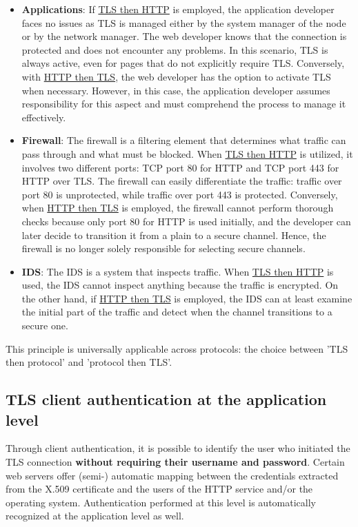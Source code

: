 \begin{itemize}
    \item \textbf{Applications}: If \underline{TLS then HTTP} is employed, the application developer faces no issues as TLS is managed either by the system manager of the node or by the network manager. The web developer knows that the connection is protected and does not encounter any problems. In this scenario, TLS is always active, even for pages that do not explicitly require TLS. Conversely, with \underline{HTTP then TLS}, the web developer has the option to activate TLS when necessary. However, in this case, the application developer assumes responsibility for this aspect and must comprehend the process to manage it effectively.
    
    \item \textbf{Firewall}: The firewall is a filtering element that determines what traffic can pass through and what must be blocked. When \underline{TLS then HTTP} is utilized, it involves two different ports: TCP port 80 for HTTP and TCP port 443 for HTTP over TLS. The firewall can easily differentiate the traffic: traffic over port 80 is unprotected, while traffic over port 443 is protected. Conversely, when \underline{HTTP then TLS} is employed, the firewall cannot perform thorough checks because only port 80 for HTTP is used initially, and the developer can later decide to transition it from a plain to a secure channel. Hence, the firewall is no longer solely responsible for selecting secure channels.
    
    \item \textbf{IDS}: The IDS is a system that inspects traffic. When \underline{TLS then HTTP} is used, the IDS cannot inspect anything because the traffic is encrypted. On the other hand, if \underline{HTTP then TLS} is employed, the IDS can at least examine the initial part of the traffic and detect when the channel transitions to a secure one.
\end{itemize}

This principle is universally applicable across protocols: the choice between 'TLS then protocol' and 'protocol then TLS'.


\subsection{TLS client authentication at the application level}

Through client authentication, it is possible to identify the user who initiated the TLS connection \textbf{without requiring their username and password}. Certain web servers offer (semi-) automatic mapping between the credentials extracted from the X.509 certificate and the users of the HTTP service and/or the operating system. Authentication performed at this level is automatically recognized at the application level as well.


